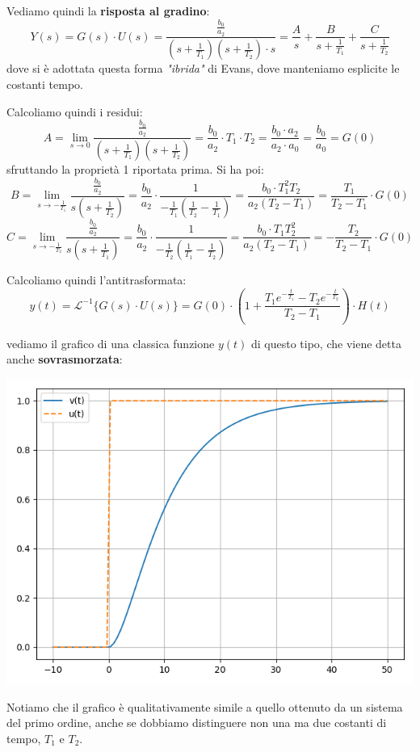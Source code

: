 \documentclass[a4paper,11pt]{article}
\begin{document}
\par\medskip

Vediamo quindi la \textbf{risposta al gradino}:
$$
Y(s) = G(s) \cdot U(s) = \frac{\frac{b_0}{a_2}}{(s + \frac{1}{T_1})(s + \frac{1}{T_2}) \cdot s} = \frac{A}{s} + \frac{B}{s + \frac{1}{T_1}} + \frac{C}{s + \frac{1}{T_2}}
$$
dove si è adottata questa forma \textit{"ibrida"} di Evans, dove manteniamo esplicite le costanti tempo.

Calcoliamo quindi i residui:
$$
A = \lim_{s \rightarrow 0} \frac{\frac{b_0}{a_2}}{(s + \frac{1}{T_1})(s + \frac{1}{T_2})} = \frac{b_0}{a_2} \cdot T_1 \cdot T_2 = \frac{b_0 \cdot a_2}{a_2 \cdot a_0} = \frac{b_0}{a_0} = G(0)
$$
sfruttando la proprietà 1 riportata prima.
Si ha poi:
$$
B = \lim_{s \rightarrow - \frac{1}{T_1}} \frac{\frac{b_0}{a_2}}{s (s + \frac{1}{T_2})} 
= \frac{b_0}{a_2} \cdot \frac{1}{-\frac{1}{T_1} (\frac{1}{T_2} - \frac{1}{T_1})} 
= \frac{b_0 \cdot T_1^2 T_2}{a_2 (T_2 - T_1)} 
= \frac{T_1}{T_2 - T_1} \cdot G(0)
$$
$$
C = \lim_{s \rightarrow - \frac{1}{T_2}} \frac{\frac{b_0}{a_2}}{s (s + \frac{1}{T_1})} 
= \frac{b_0}{a_2} \cdot \frac{1}{-\frac{1}{T_2} (\frac{1}{T_1} - \frac{1}{T_2})} 
= \frac{b_0 \cdot T_1 T_2^2}{a_2 (T_2 - T_1)} 
= -\frac{T_2}{T_2 - T_1} \cdot G(0)
$$

Calcoliamo quindi l'antitrasformata:
$$
y(t) = \mathcal{L}^{-1} \{ G(s) \cdot U(s) \} = G(0) \cdot \left( 1 + \frac{T_1 e^{-\frac{t}{T_1}} - T_2 e^{-\frac{t}{T_2}}}{T_2 - T_1} \right) \cdot H(t)
$$

\noindent
\begin{minipage}{\textwidth}
vediamo il grafico di una classica funzione $y(t)$ di questo tipo, che viene detta anche \textbf{sovrasmorzata}:
\begin{center}
	\includegraphics[scale=0.66]{../figures/second_degree_overdamped.png}
\end{center}
\end{minipage}

Notiamo che il grafico è qualitativamente simile a quello ottenuto da un sistema del primo ordine, anche se dobbiamo distinguere non una ma due costanti di tempo, $T_1$ e $T_2$.
\end{document}

